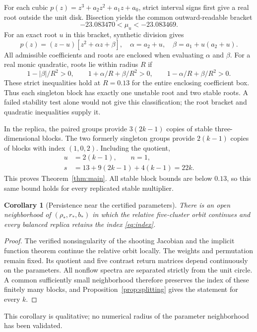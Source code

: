 \documentclass[11pt]{article}
\newtheorem{corollary}[theorem]{Corollary}
\begin{document}
For each cubic $p(z)=z^3+a_2z^2+a_1z+a_0$, strict interval signs first
give a real root outside the unit disk. Bisection yields the common
outward-readable bracket
\begin{equation}
 -23.083470<\mu_u<-23.083469.\label{eq:root}
\end{equation}
For an exact root $u$ in this bracket, synthetic division gives
\begin{equation}
 p(z)=(z-u)\left[z^2+\alpha z+\beta\right],\quad
 \alpha=a_2+u,\quad \beta=a_1+u(a_2+u).\label{eq:division}
\end{equation}
All admissible coefficients and roots are enclosed when evaluating
$\alpha$ and $\beta$. For a real monic quadratic, roots lie within radius
$R$ if
\begin{equation}
 1-|\beta|/R^2>0,\qquad
 1+\alpha/R+\beta/R^2>0,\qquad
 1-\alpha/R+\beta/R^2>0.\label{eq:jury}
\end{equation}
These strict inequalities hold at $R=0.13$ for the entire enclosing
coefficient box. Thus each singleton block has exactly one unstable root
and two stable roots. A failed stability test alone would not give this
classification; the root bracket and quadratic inequalities supply it.

In the replica, the paired groups provide $3(2k-1)$ copies of stable
three-dimensional blocks. The two formerly singleton groups provide
$2(k-1)$ copies of blocks with index $(1,0,2)$. Including the quotient,
\begin{align*}
 u&=2(k-1),\qquad n=1,\\
 s&=13+9(2k-1)+4(k-1)=22k.
\end{align*}
This proves Theorem~\ref{thm:main}. All stable block bounds are below
$0.13$, so this same bound holds for every replicated stable multiplier.

\begin{corollary}[Persistence near the certified parameters]
There is an open neighborhood of $(\rho_*,r_*,b_*)$ in which the relative
five-cluster orbit continues and every balanced replica retains the
index \eqref{eq:index}.
\end{corollary}
\begin{proof}
The verified nonsingularity of the shooting Jacobian and the implicit
function theorem continue the relative orbit locally. The weights and
permutation remain fixed. Its quotient and five contrast return matrices
depend continuously on the parameters. All nonflow spectra are separated
strictly from the unit circle. A common sufficiently small neighborhood
therefore preserves the index of these finitely many blocks, and
Proposition~\ref{prop:splitting} gives the statement for every $k$.
\end{proof}
This corollary is qualitative; no numerical radius of the parameter
neighborhood has been validated.
\end{document}
